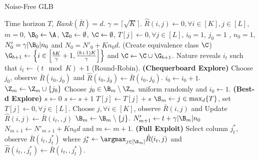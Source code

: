 \begin{algorithm}[!th]
\caption{Noise-Free GLB}
\label{alg:NFGLB}
\begin{algorithmic}[1]
 Time horizon $T$, $Rank(\bar{R}) = d$.
 $\gamma = \lceil\sqrt{K} \rceil$.
 $\hat{R}(i,j) \leftarrow 0, \forall i\in [K], j\in [L]$, $m=0$, $\B_0 \leftarrow \A$, $\Z_0 \leftarrow \emptyset$, $\C \leftarrow \emptyset$, $T[j]\leftarrow 0, \forall j\in [L]$, $i_0=1$, $j_0=1$ , $n_0 = 1 $, $N'_0 =  \gamma |\B_0|n_0 $ and $N_0 = N'_0 + K n_0 d$.
 (Create equivalence class $\C$)
\State  $\G_{b+1}\leftarrow \left\lbrace i\in \left[\frac{bK}{\gamma}+1,\frac{(b+1)K}{\gamma}\right]\right\rbrace$ and $\C\leftarrow \C\cup \G_{b+1}$.
\EndFor
{}	
\State Nature reveals $i_t$ such that $i_t \leftarrow (t \mod K) + 1$ (Round-Robin).
  \textbf{ (Chequerboard Explore) }
\State Choose $j_0$, observe $\bar{R}(i_0,j_0)$ and $\hat{R}(i_0,j_0)\leftarrow \bar{R}(i_0,j_0)$.
\State $i_0 \leftarrow i_0 + 1$.
\Else
\State $\Z_m \leftarrow \Z_m \cup \lbrace j_0\rbrace$
\State Choose $j_0\in\B_m\setminus \Z_m$ uniform randomly and $i_0 \leftarrow 1$.
\EndIf
{}  \textbf{ (Best-d Explore) }
\State {}
\State $s \leftarrow 0$
\State {}
\State {}
\State $s \leftarrow s + 1$
\EndIf
\EndFor
\State $T[j] \leftarrow T[j] + s$
\EndFor
\State $\S_m \leftarrow j \in \max_{d}\lbrace T\rbrace$, set $T[j]\leftarrow 0, \forall j\in [L]$.
\State {}
\State Choose $j, \forall i \in  [K]$, observe $\bar{R}(i,j)$ and Update $\hat{R}(i,j)\leftarrow \bar{R}(i_t,,j)$
\EndFor
\Else
\ColElim
\State {}
\State {}
\State $\B_m \leftarrow \B_m \setminus \lbrace j \rbrace$. 
\EndWhile
\EndFor
\EndColElim
\ResParam
\State $N'_{m + 1}  \leftarrow t +  \gamma |\B_m| n_0 $
\State $N_{m+1} \leftarrow N'_{m + 1} + K n_0 d$ and $m \leftarrow m + 1$.
\EndResParam
\EndIf
\Else \textbf{ (Full Exploit) }
\State  Select column $j_t^*$, observe $\bar{R}(i_t,j_t^*)$ where $j_t^* \leftarrow \argmax_{j\in[\B_m]} {\hat{R}(i_t,j)}$ and $\hat{R}(i_t,,j_t^*)\leftarrow \bar{R}(i_t,,j_t^*)$.
\EndIf
\EndFor
\end{algorithmic}
\end{algorithm}


